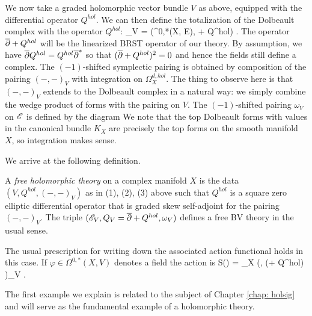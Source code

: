 We now take a graded holomorphic vector bundle $V$ as above, equipped with the differential operator $Q^{hol}$. 
We can then define the totalization of the Dolbeault complex with the operator $Q^{hol}$:
\ben
\sE_V = \left(\Omega^{0,*}(X, E), \dbar + Q^{hol}\right) .
\een
The operator $\overline{\partial} + Q^{hol}$ will be the linearized BRST operator of our theory.
By assumption, we have $\overline{\partial} Q^{hol} = Q^{hol} \overline{\partial}^*$ so that $(\overline{\partial} + Q^{hol})^2 = 0$ and hence the fields still define a complex. 
The $(-1)$-shifted symplectic pairing is obtained by composition of the pairing $(-,-)_V$ with integration on $\Omega^{d,hol}_X$. 
The thing to observe here is that $(-,-)_V$ extends to the Dolbeault complex in a natural way: we simply combine the wedge product of forms with the pairing on $V$.
The $(-1)$-shifted pairing $\omega_V$ on $\mathscr E$ is defined by the diagram
\ben
{}
\een
We note that the top Dolbeault forms with values in the canonical bundle $K_X$ are precisely the top forms on the smooth manifold $X$, so integration makes sense. 

We arrive at the following definition. 

\begin{dfn/lem}\label{dfn hol free theory}
A {\em free holomorphic theory} on a complex manifold $X$ is the data $(V, Q^{hol}, (-,-)_V)$ as in (1), (2), (3) above such that $Q^{hol}$ is a square zero elliptic differential operator that is graded skew self-adjoint for the pairing $(-,-)_V$.
The triple $(\mathscr E_V, Q_V = \overline{\partial} + Q^{hol}, \omega_V)$ defines a free BV theory in the usual sense.
\end{dfn/lem}

The usual prescription for writing down the associated action functional holds in this case.
If $\varphi \in \Omega^{0,*}(X , V)$ denotes a field the action is
\ben
S(\varphi) = \int_X \left(\varphi, (\dbar + Q^{hol}) \varphi \right)_V .
\een

The first example we explain is related to the subject of Chapter \ref{chap: holsig} and will serve as the fundamental example of a holomorphic theory. 

